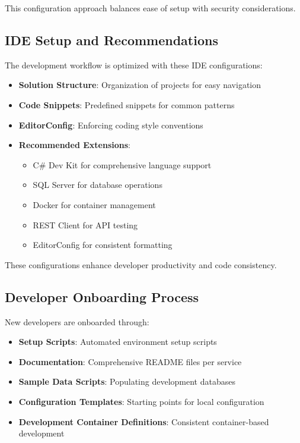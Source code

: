 This configuration approach balances ease of setup with security considerations.

\subsection{IDE Setup and Recommendations}
The development workflow is optimized with these IDE configurations:
\begin{itemize}
    \item \textbf{Solution Structure}: Organization of projects for easy navigation
    \item \textbf{Code Snippets}: Predefined snippets for common patterns
    \item \textbf{EditorConfig}: Enforcing coding style conventions
    \item \textbf{Recommended Extensions}:
    \begin{itemize}
        \item C\# Dev Kit for comprehensive language support
        \item SQL Server for database operations
        \item Docker for container management
        \item REST Client for API testing
        \item EditorConfig for consistent formatting
    \end{itemize}
\end{itemize}

These configurations enhance developer productivity and code consistency.

\subsection{Developer Onboarding Process}
New developers are onboarded through:
\begin{itemize}
    \item \textbf{Setup Scripts}: Automated environment setup scripts
    \item \textbf{Documentation}: Comprehensive README files per service
    \item \textbf{Sample Data Scripts}: Populating development databases
    \item \textbf{Configuration Templates}: Starting points for local configuration
    \item \textbf{Development Container Definitions}: Consistent container-based development
\end{itemize}

